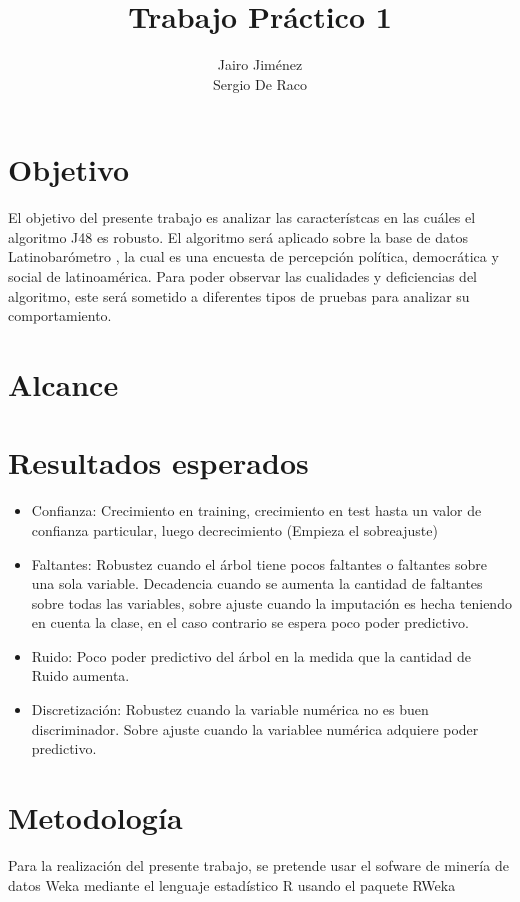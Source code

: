 \documentclass[]{article}
\title{Trabajo Práctico 1}
\author{Jairo Jiménez \\
	Sergio De Raco}
\begin{document}
\maketitle


\section*{Objetivo}
El objetivo del presente trabajo es analizar las característcas en las cuáles el algoritmo J48 es robusto. El algoritmo será aplicado sobre la base de datos Latinobarómetro \cite{Latinobarometro2011}, la cual es una encuesta de percepción política, democrática y social de latinoamérica. Para poder observar las cualidades y deficiencias del algoritmo, este será sometido a diferentes tipos de pruebas para analizar su comportamiento.

\section*{Alcance}


\section*{Resultados esperados}
\begin{itemize}
	\item Confianza: Crecimiento en training, crecimiento en test hasta un valor de confianza particular, luego decrecimiento (Empieza el sobreajuste)
	\item Faltantes: Robustez cuando el árbol tiene pocos faltantes o faltantes sobre una sola variable. Decadencia cuando se aumenta la cantidad de faltantes sobre todas las variables, sobre ajuste cuando la imputación es hecha teniendo en cuenta la clase, en el caso contrario se espera poco poder predictivo.
	\item Ruido: Poco poder predictivo del árbol en la medida que la cantidad de Ruido aumenta.
	\item Discretización: Robustez cuando la variable numérica no es buen discriminador. Sobre ajuste cuando la variablee numérica adquiere poder predictivo.
\end{itemize}

\section*{Metodología}
Para la realización del presente trabajo, se pretende usar el sofware de minería de datos Weka \cite{Weka1} mediante el lenguaje estadístico R \cite{RCran} usando el paquete RWeka \cite{RWeka}
\end{document}
